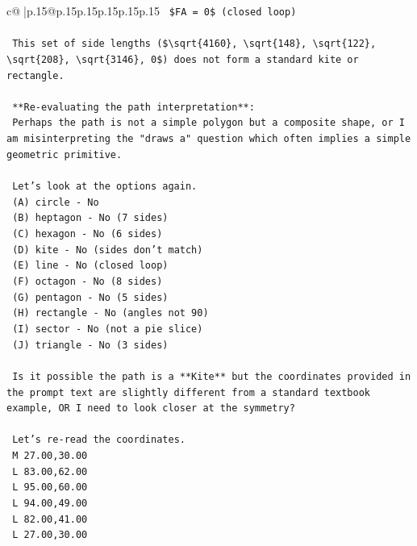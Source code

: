 \documentclass{article}
\begin{document}
{\begin{supertabular}{c@{$\;$}|p{.15\linewidth}@{}p{.15\linewidth}p{.15\linewidth}p{.15\linewidth}p{.15\linewidth}p{.15\linewidth}}
{{{\texttt{    \$FA = 0\$ (closed loop)} \\
\\ 
\texttt{    This set of side lengths (\$\textbackslash{}sqrt\{4160\}, \textbackslash{}sqrt\{148\}, \textbackslash{}sqrt\{122\}, \textbackslash{}sqrt\{208\}, \textbackslash{}sqrt\{3146\}, 0\$) does not form a standard kite or rectangle.} \\
\\ 
\texttt{    **Re{-}evaluating the path interpretation**:} \\
\texttt{    Perhaps the path is not a simple polygon but a composite shape, or I am misinterpreting the "draws a" question which often implies a simple geometric primitive.} \\
\\ 
\texttt{    Let's look at the options again.} \\
\texttt{    (A) circle {-} No} \\
\texttt{    (B) heptagon {-} No (7 sides)} \\
\texttt{    (C) hexagon {-} No (6 sides)} \\
\texttt{    (D) kite {-} No (sides don't match)} \\
\texttt{    (E) line {-} No (closed loop)} \\
\texttt{    (F) octagon {-} No (8 sides)} \\
\texttt{    (G) pentagon {-} No (5 sides)} \\
\texttt{    (H) rectangle {-} No (angles not 90)} \\
\texttt{    (I) sector {-} No (not a pie slice)} \\
\texttt{    (J) triangle {-} No (3 sides)} \\
\\ 
\texttt{    Is it possible the path is a **Kite** but the coordinates provided in the prompt text are slightly different from a standard textbook example, OR I need to look closer at the symmetry?} \\
\\ 
\texttt{    Let's re{-}read the coordinates.} \\
\texttt{    M 27.00,30.00} \\
\texttt{    L 83.00,62.00} \\
\texttt{    L 95.00,60.00} \\
\texttt{    L 94.00,49.00} \\
\texttt{    L 82.00,41.00} \\
\texttt{    L 27.00,30.00} \\
}}}
\end{supertabular}}
\end{document}
